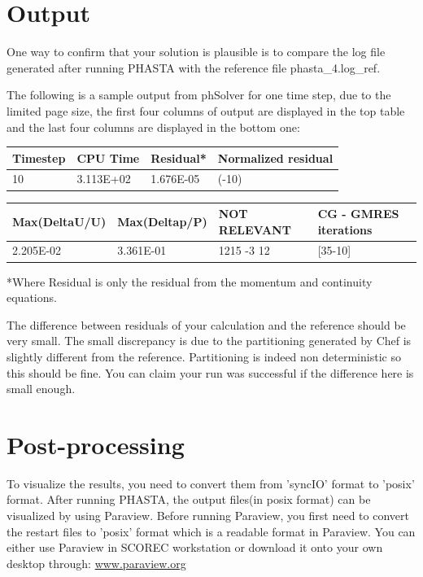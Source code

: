 \documentclass{article}
\begin{document}
\section{Output}

One way to confirm that your solution is plausible is to compare the log file generated after running PHASTA with the reference file phasta\_4.log\_ref.

The following is a sample output from phSolver for one time step, due to the limited page size, the first four columns of output are displayed in the top table and the last four columns are displayed in the bottom one:
\begin{center}
    \begin{tabular}{| l | l | l | l |}
    \hline
    Timestep & CPU Time & Residual* & Normalized residual \\ \hline
    10 & 3.113E+02 & 1.676E-05 & (-10) \\ 
\hline
    \end{tabular}
\end{center}

\begin{center}
    \begin{tabular}{| l | l | l | l |}
\hline
Max(DeltaU/U) & Max(Deltap/P) & NOT RELEVANT& CG - GMRES iterations\\ \hline
      2.205E-02 & 3.361E-01 & 1215 -3 12  & [35-10] \\
    \hline
    \end{tabular}
\end{center}

*Where Residual is only the residual from the momentum and continuity equations.

The difference between residuals of your calculation and the reference should be very small. The small discrepancy is due to the partitioning generated by Chef is slightly different from the reference. Partitioning is indeed non deterministic so this should be fine. You can claim your run was successful if the difference here is small enough.

\section{Post-processing}

To visualize the results, you need to convert them from 'syncIO' format to 'posix' format. After running PHASTA, the output files(in posix format) can be visualized by using Paraview. Before running Paraview, you first need to convert the restart files to 'posix' format which is a readable format in Paraview. You can either use Paraview in SCOREC workstation or download it onto your own desktop through:
\url{www.paraview.org}
\end{document}
